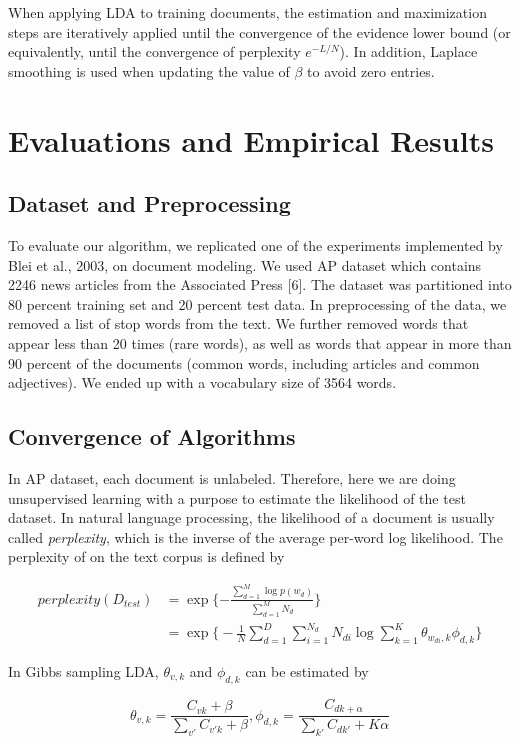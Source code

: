 \documentclass{article} %
\begin{document}
When applying LDA to training documents, the estimation and maximization steps are iteratively applied until the convergence of the evidence lower bound (or equivalently, until the convergence of perplexity $e^{-L/N}$). In addition, Laplace smoothing is used when updating the value of $\beta$ to avoid zero entries.

\section{Evaluations and Empirical Results}
\subsection{Dataset and Preprocessing}
To evaluate our algorithm, we replicated one of the experiments implemented by Blei et al., 2003, on document modeling. We used AP dataset which contains 2246 news articles from the Associated Press [6]. The dataset was partitioned into 80 percent training set and 20 percent test data. In preprocessing of the data, we removed a list of stop words from the text. We further removed words that appear less than 20 times (rare words), as well as words that appear in more than 90 percent of the documents (common words, including articles and common adjectives). We ended up with a vocabulary size of 3564 words.

\subsection{Convergence of Algorithms}
In AP dataset, each document is unlabeled. Therefore, here we are doing unsupervised learning with a purpose to estimate the likelihood of the test dataset. In natural language processing, the likelihood of a document is usually called \textit{perplexity}, which is the inverse of the average per-word log likelihood. The perplexity of on the text corpus is defined by

\begin{align}
perplexity(D_{test}) &= \exp\Big\{{-\frac{\sum_{d=1}^{M} \log{p(w_d)}}{\sum_{d=1}^{M}N_d}}\Big\} \label{eq:pplex} \\
& = \exp \Big\{ -\frac{1}{N}\sum_{d=1}^{D}\sum_{i=1}^{N_d}N_{di}\log \sum_{k=1}^{K}\theta_{w_{di}, k}\phi_{d,k} \Big\}
\end{align}

In Gibbs sampling LDA, $\theta_{v, k}$ and $\phi_{d,k}$ can be estimated by

$$\theta_{v,k} = \frac{C_{vk}+\beta}{\sum_{v'}C_{v' k}+\beta}, \phi_{d,k} = \frac{C_{dk+\alpha}}{\sum_{k'}C_{dk'}+K\alpha}$$
\end{document}
